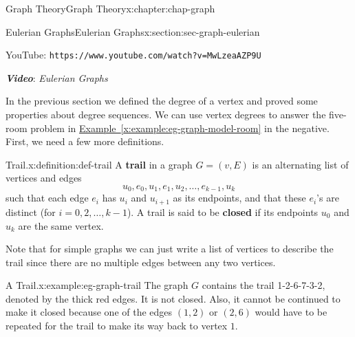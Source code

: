 \documentclass[oneside,10pt,]{book}
\newcommand{\xreffont}{\relax}
\newcommand{\mono}[1]{\texttt{#1}}
\newcommand{\alert}[1]{\textbf{\textit{#1}}}
\newcommand{\terminology}[1]{\textbf{#1}}
\numberwithin{equation}{section}
\newlength{\qrsize}
\newlength{\previewwidth}
\begin{document}
\begin{chapterptx}{Graph Theory}{}{Graph Theory}{}{}{x:chapter:chap-graph}
\begin{sectionptx}{Eulerian Graphs}{}{Eulerian Graphs}{}{}{x:section:sec-graph-eulerian}
\begin{sidebyside}{1}{0}{0}{0}
\begin{sbspanel}{1}
\begin{tcbraster}[raster columns=2, raster column skip=1pt, raster halign=center, raster force size=false, raster left skip=0pt, raster right skip=0pt]
\begin{tcolorbox}[previewstyle, width=\previewwidth]
\end{tcolorbox}%
\begin{tcolorbox}[qrstyle]%
{\hypersetup{urlcolor=black}}%
\end{tcolorbox}%
\begin{tcolorbox}[captionstyle]%
\small YouTube: \mono{https://www.youtube.com/watch?v=MwLzeaAZP9U}\end{tcolorbox}%
\end{tcbraster}%
\end{sbspanel}%
\end{sidebyside}%
\par
\alert{Video}: \emph{Eulerian Graphs}%
\par
In the previous section we defined the degree of a vertex and proved some properties about degree sequences. We can use vertex degrees to answer the five-room problem in \hyperref[x:example:eg-graph-model-room]{Example~{\xreffont\ref{x:example:eg-graph-model-room}}} in the negative. First, we need a few more definitions.%
\begin{definition}{Trail.}{x:definition:def-trail}%
A \terminology{trail} in a graph \(G = (v,E)\) is an alternating list of vertices and edges%
\begin{equation*}
u_0,e_0,u_1,e_1,u_2,\ldots,e_{k-1},u_k
\end{equation*}
such that each edge \(e_i\) has \(u_i\) and \(u_{i+1}\) as its endpoints, and that these \(e_i\)'s are distinct (for \(i = 0,2,\ldots,k-1\)). A trail is said to be \terminology{closed} if its endpoints \(u_0\) and \(u_k\) are the same vertex.%
\end{definition}
Note that for simple graphs we can just write a list of vertices to describe the trail since there are no multiple edges between any two vertices.%
\begin{example}{A Trail.}{x:example:eg-graph-trail}%
The graph \(G\) contains the trail 1-2-6-7-3-2, denoted by the thick red edges. It is not closed. Also, it cannot be continued to make it closed because one of the edges \((1,2)\) or \((2,6)\) would have to be repeated for the trail to make its way back to vertex \(1\).%
\begin{sidebyside}{1}{0.325}{0.325}{0}%
\begin{sbspanel}{0.35}%
\resizebox{\linewidth}{!}{%
			\begin{tikzpicture}[scale=0.5]
\begin{scope}[every node/.style={fill=black,circle, inner sep = 1.5pt, minimum size = 2pt}]

\end{scope}
\end{tikzpicture}}
\end{sbspanel}
\end{sidebyside}
\end{example}
\end{sectionptx}
\end{chapterptx}
\end{document}
